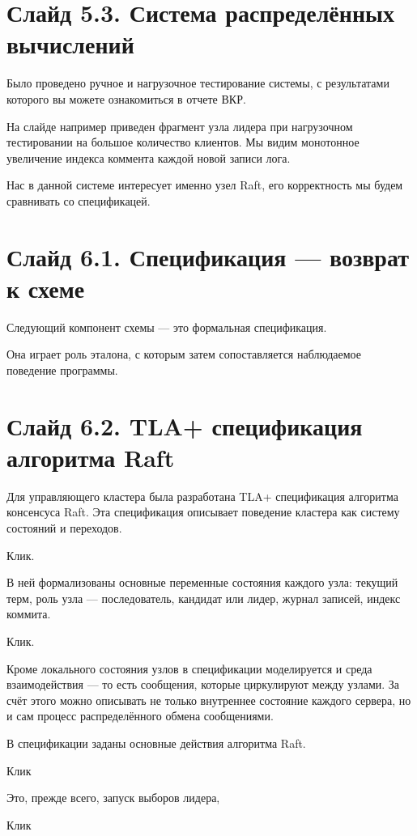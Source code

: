 \documentclass[12pt,a4paper]{article}
\begin{document}
\section*{Слайд 5.3. Система распределённых вычислений}

Было проведено ручное и нагрузочное тестирование системы, с результатами
которого вы можете ознакомиться в отчете ВКР.

На слайде например приведен фрагмент узла лидера при нагрузочном тестировании
на большое количество клиентов. Мы видим монотонное увеличение индекса коммента
каждой новой записи лога.

Нас в данной системе интересует именно узел Raft, его корректность мы будем
сравнивать со спецификацей.

\section*{Слайд 6.1. Спецификация --- возврат к схеме}

Следующий компонент схемы --- это формальная спецификация.

Она играет роль эталона, с которым затем сопоставляется наблюдаемое
поведение программы.

\section*{Слайд 6.2. TLA+ спецификация алгоритма Raft}

Для управляющего кластера была разработана TLA+ спецификация алгоритма
консенсуса Raft. Эта спецификация описывает поведение кластера как систему
состояний и переходов.

Клик.

В ней формализованы основные переменные состояния каждого
узла: текущий терм, роль узла — последователь, кандидат или лидер,
журнал записей, индекс коммита.

Клик.

Кроме локального состояния узлов в спецификации моделируется и среда
взаимодействия — то есть сообщения, которые циркулируют между узлами.
За счёт этого можно описывать не только внутреннее состояние каждого
сервера, но и сам процесс распределённого обмена сообщениями.


В спецификации заданы основные действия алгоритма Raft.

Клик

Это, прежде всего, запуск выборов лидера,

Клик
\end{document}
